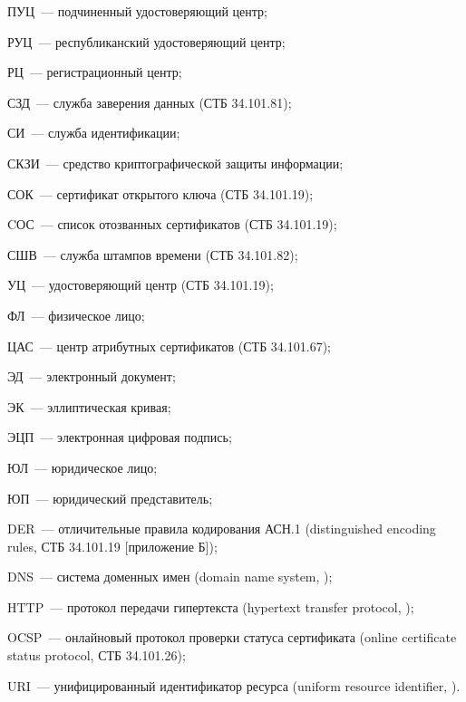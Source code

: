 ПУЦ~--- подчиненный удостоверяющий центр;

РУЦ~--- республиканский удостоверяющий центр;

РЦ~--- регистрационный центр;

СЗД~--- служба заверения данных (СТБ 34.101.81);

СИ~--- служба идентификации;

СКЗИ~--- средство криптографической защиты информации;

СОК~--- сертификат открытого ключа (СТБ 34.101.19);

CОС~--- список отозванных сертификатов (СТБ 34.101.19);

СШВ~--- служба штампов времени (СТБ 34.101.82);

УЦ~--- удостоверяющий центр (СТБ 34.101.19);

ФЛ~--- физическое лицо;

ЦАС~--- центр атрибутных сертификатов (СТБ 34.101.67);

ЭД~--- электронный документ;

ЭК~--- эллиптическая кривая;

ЭЦП~--- электронная цифровая подпись;

ЮЛ~--- юридическое лицо;

ЮП~--- юридический представитель;

DER~--- отличительные правила кодирования АСН.1
(distinguished encoding rules, СТБ 34.101.19 [приложение Б]);

DNS~--- система доменных имен (domain name system, \cite{DNS});

HTTP~--- протокол передачи гипертекста 
(hypertext transfer protocol, \cite{HTTP});

OCSP~--- онлайновый протокол проверки статуса сертификата
(online certificate status protocol, СТБ 34.101.26);

URI~--- унифицированный идентификатор ресурса 
(uniform resource identifier, \cite{URI}).

